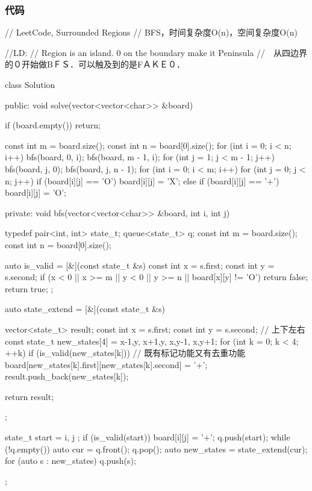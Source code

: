 \subsubsection{代码}
\begin{Code}
// LeetCode, Surrounded Regions
// BFS，时间复杂度O(n)，空间复杂度O(n)

//LD:
// Region is an island. 0 on the boundary make it Peninsula
//　从四边界的０开始做BＦＳ．可以触及到的是FＡＫＥ０．


class Solution {
public:
    void solve(vector<vector<char>> &board) {
        if (board.empty()) return;

        const int m = board.size();
        const int n = board[0].size();
        for (int i = 0; i < n; i++) {
            bfs(board, 0, i);
            bfs(board, m - 1, i);
        }
        for (int j = 1; j < m - 1; j++) {
            bfs(board, j, 0);
            bfs(board, j, n - 1);
        }
        for (int i = 0; i < m; i++)
            for (int j = 0; j < n; j++)
                if (board[i][j] == 'O')
                    board[i][j] = 'X';
                else if (board[i][j] == '+')
                    board[i][j] = 'O';
    }
private:
    void bfs(vector<vector<char>> &board, int i, int j) {
        typedef pair<int, int> state_t;
        queue<state_t> q;
        const int m = board.size();
        const int n = board[0].size();

        auto is_valid = [&](const state_t &s) {
            const int x = s.first;
            const int y = s.second;
            if (x < 0 || x >= m || y < 0 || y >= n || board[x][y] != 'O')
                return false;
            return true;
        };

        auto state_extend = [&](const state_t &s) {
            vector<state_t> result;
            const int x = s.first;
            const int y = s.second;
            // 上下左右
            const state_t new_states[4] = {{x-1,y}, {x+1,y},
                    {x,y-1}, {x,y+1}};
            for (int k = 0; k < 4;  ++k) {
                if (is_valid(new_states[k])) {
                    // 既有标记功能又有去重功能
                    board[new_states[k].first][new_states[k].second] = '+';
                    result.push_back(new_states[k]);
                }
            }

            return result;
        };

        state_t start = { i, j };
        if (is_valid(start)) {
            board[i][j] = '+';
            q.push(start);
        }
        while (!q.empty()) {
            auto cur = q.front();
            q.pop();
            auto new_states = state_extend(cur);
            for (auto s : new_states) q.push(s);
        }
    }
};
\end{Code}


